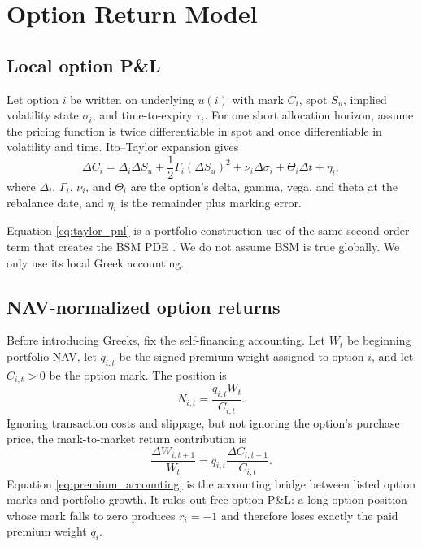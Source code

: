 \section{Option Return Model}

\subsection{Local option P\&L}

Let option $i$ be written on underlying $u(i)$ with mark $C_i$, spot
$S_u$, implied volatility state $\sigma_i$, and time-to-expiry $\tau_i$.
For one short allocation horizon, assume the pricing function is twice
differentiable in spot and once differentiable in volatility and time.
Ito--Taylor expansion gives
\begin{equation}
  \Delta C_i
  =
  \Delta_i \Delta S_u
  + \frac12 \Gamma_i(\Delta S_u)^2
  + \nu_i \Delta\sigma_i
  + \Theta_i\Delta t
  + \eta_i,
  \label{eq:taylor_pnl}
\end{equation}
where $\Delta_i$, $\Gamma_i$, $\nu_i$, and $\Theta_i$ are the option's
delta, gamma, vega, and theta at the rebalance date, and $\eta_i$ is the
remainder plus marking error.

Equation \eqref{eq:taylor_pnl} is a portfolio-construction use of the
same second-order term that creates the BSM PDE
\citep{blackscholes1973,merton1973,shreve2004stochasticii}. We do not
assume BSM is true globally. We only use its local Greek accounting.

\subsection{NAV-normalized option returns}

Before introducing Greeks, fix the self-financing accounting.  Let \(W_t\) be beginning
portfolio NAV, let \(q_{i,t}\) be the signed premium weight assigned to option \(i\), and
let \(C_{i,t}>0\) be the option mark.  The position is
\[
  N_{i,t}=\frac{q_{i,t}W_t}{C_{i,t}} .
\]
Ignoring transaction costs and slippage, but not ignoring the option's purchase price, the
mark-to-market return contribution is
\[
  \frac{\Delta W_{i,t+1}}{W_t}
  =
  q_{i,t}\frac{\Delta C_{i,t+1}}{C_{i,t}} .
  \label{eq:premium_accounting}
\]
Equation \eqref{eq:premium_accounting} is the accounting bridge between listed option
marks and portfolio growth.  It rules out free-option P\&L: a long option position whose
mark falls to zero produces \(r_i=-1\) and therefore loses exactly the paid premium
weight \(q_i\).

